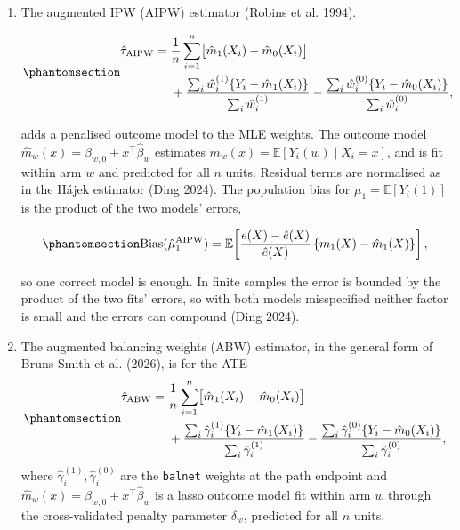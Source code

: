 \documentclass[
  12pt,
  a4paper,
]{article}
\begin{document}
\begin{enumerate}
\def\labelenumi{\arabic{enumi}.}
\item
  The augmented IPW (AIPW) estimator (Robins et al. 1994).

  \begin{equation}\protect\phantomsection\label{eq-aipw}{\begin{aligned}
  \hat\tau_{\mathrm{AIPW}} ={}& \frac{1}{n}\sum_{i=1}^{n}\bigl[\hat m_1(X_i) - \hat m_0(X_i)\bigr] \\
  &+ \frac{\sum_{i}\hat w_i^{(1)}\{Y_i - \hat m_1(X_i)\}}{\sum_{i}\hat w_i^{(1)}}
  - \frac{\sum_{i}\hat w_i^{(0)}\{Y_i - \hat m_0(X_i)\}}{\sum_{i}\hat w_i^{(0)}},
  \end{aligned}}\end{equation}

  adds a penalised outcome model to the MLE weights. The outcome model
  \(\hat m_w(x) = \hat\beta_{w,0} + x^\top\hat\beta_w\) estimates
  \(m_w(x) = \mathbb{E}[Y_i(w) \mid X_i = x]\), and is fit within arm
  \(w\) and predicted for all \(n\) units. Residual terms are normalised
  as in the Hájek estimator (Ding 2024). The population bias for
  \(\mu_1 = \mathbb{E}[Y_i(1)]\) is the product of the two models'
  errors,

  \begin{equation}\protect\phantomsection\label{eq-aipw-bias}{\operatorname{Bias}(\hat\mu_1^{\mathrm{AIPW}}) = \mathbb{E}\!\left[\frac{e(X) - \hat e(X)}{\hat e(X)}\,\{m_1(X) - \hat m_1(X)\}\right],}\end{equation}

  so one correct model is enough. In finite samples the error is bounded
  by the product of the two fits' errors, so with both models
  misspecified neither factor is small and the errors can compound (Ding
  2024).
\item
  The augmented balancing weights (ABW) estimator, in the general form
  of Bruns-Smith et al. (2026), is for the ATE
  \begin{equation}\protect\phantomsection\label{eq-abw}{\begin{aligned} \hat\tau_{\mathrm{ABW}} ={}& \frac{1}{n}\sum_{i=1}^{n}\bigl[\hat m_1(X_i) - \hat m_0(X_i)\bigr] \\ &+ \frac{\sum_{i}\hat\gamma_i^{(1)}\{Y_i - \hat m_1(X_i)\}}{\sum_{i}\hat\gamma_i^{(1)}} - \frac{\sum_{i}\hat\gamma_i^{(0)}\{Y_i - \hat m_0(X_i)\}}{\sum_{i}\hat\gamma_i^{(0)}}, \end{aligned}}\end{equation}
  where \(\hat\gamma_i^{(1)}, \hat\gamma_i^{(0)}\) are the
  \texttt{balnet} weights at the path endpoint and
  \(\hat m_w(x) = \hat\beta_{w,0} + x^\top\hat\beta_w\) is a lasso
  outcome model fit within arm \(w\) through the cross-validated penalty
  parameter \(\delta_w\), predicted for all \(n\) units.


\end{enumerate}
\end{document}
